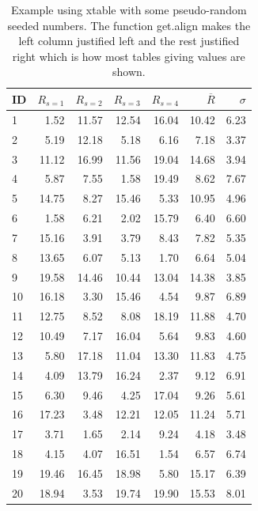 \documentclass[11pt]{book}\usepackage[]{graphicx}\usepackage[]{color}
\begin{document}
\begin{table}[ht]
\centering
\caption{Example using xtable with some pseudo-random seeded numbers. The function get.align makes the left column justified left and the rest justified right which is how most tables giving values are shown.} 
\label{tab:example-xtable}
\begin{tabular}{lrrrrrr}
  \hline
\textbf{ID} & $R_{s=1}$ & $R_{s=2}$ & $R_{s=3}$ & $R_{s=4}$ & $\overline{R}$ & $\sigma$ \\ 
  \hline
  1 & 1.52 & 11.57 & 12.54 & 16.04 & 10.42 & 6.23 \\ 
    2 & 5.19 & 12.18 & 5.18 & 6.16 & 7.18 & 3.37 \\ 
    3 & 11.12 & 16.99 & 11.56 & 19.04 & 14.68 & 3.94 \\ 
    4 & 5.87 & 7.55 & 1.58 & 19.49 & 8.62 & 7.67 \\ 
    5 & 14.75 & 8.27 & 15.46 & 5.33 & 10.95 & 4.96 \\ 
    6 & 1.58 & 6.21 & 2.02 & 15.79 & 6.40 & 6.60 \\ 
    7 & 15.16 & 3.91 & 3.79 & 8.43 & 7.82 & 5.35 \\ 
    8 & 13.65 & 6.07 & 5.13 & 1.70 & 6.64 & 5.04 \\ 
    9 & 19.58 & 14.46 & 10.44 & 13.04 & 14.38 & 3.85 \\ 
   10 & 16.18 & 3.30 & 15.46 & 4.54 & 9.87 & 6.89 \\ 
   11 & 12.75 & 8.52 & 8.08 & 18.19 & 11.88 & 4.70 \\ 
   12 & 10.49 & 7.17 & 16.04 & 5.64 & 9.83 & 4.60 \\ 
   13 & 5.80 & 17.18 & 11.04 & 13.30 & 11.83 & 4.75 \\ 
   14 & 4.09 & 13.79 & 16.24 & 2.37 & 9.12 & 6.91 \\ 
   15 & 6.30 & 9.46 & 4.25 & 17.04 & 9.26 & 5.61 \\ 
   16 & 17.23 & 3.48 & 12.21 & 12.05 & 11.24 & 5.71 \\ 
   17 & 3.71 & 1.65 & 2.14 & 9.24 & 4.18 & 3.48 \\ 
   18 & 4.15 & 4.07 & 16.51 & 1.54 & 6.57 & 6.74 \\ 
   19 & 19.46 & 16.45 & 18.98 & 5.80 & 15.17 & 6.39 \\ 
   20 & 18.94 & 3.53 & 19.74 & 19.90 & 15.53 & 8.01 \\ 
   \hline
\end{tabular}
\end{table}
\end{document}
